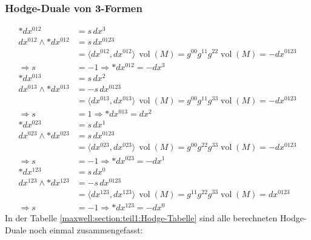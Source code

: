 \subsubsection{Hodge-Duale von 3-Formen}
\begin{align*}
	\ast dx^{012} &= s \, dx^3 \\
	dx^{012} \wedge \ast dx^{012} &= s \, dx^{0123} \\
	&= \langle dx^{012}, dx^{012} \rangle \, \operatorname{vol}(M) 
	= g^{00} g^{11} g^{22} \operatorname{vol}(M) = -dx^{0123} \\
	\Rightarrow s &= -1 \Rightarrow \boxed{\ast dx^{012} = - dx^3}
	\\[1em]
	\ast dx^{013} &= s \, dx^2 \\
	dx^{013} \wedge \ast dx^{013} &= -s \, dx^{0123} \\
	&= \langle dx^{013}, dx^{013} \rangle \, \operatorname{vol}(M) 
	= g^{00} g^{11} g^{33} \operatorname{vol}(M) = -dx^{0123} \\
	\Rightarrow s &= 1 \Rightarrow \boxed{\ast dx^{013} = dx^2}
	\\[1em]
	\ast dx^{023} &= s \, dx^1 \\
	dx^{023} \wedge \ast dx^{023} &= s \, dx^{0123} \\
	&= \langle dx^{023}, dx^{023} \rangle \, \operatorname{vol}(M) 
	= g^{00} g^{22} g^{33} \operatorname{vol}(M) = -dx^{0123} \\
	\Rightarrow s &= -1 \Rightarrow \boxed{\ast dx^{023} = - dx^1}
	\\[1em]
	\ast dx^{123} &= s \, dx^0 \\
	dx^{123} \wedge \ast dx^{123} &= -s \, dx^{0123} \\
	&= \langle dx^{123}, dx^{123} \rangle \, \operatorname{vol}(M)
	= g^{11} g^{22} g^{33} \operatorname{vol}(M) = dx^{0123} \\
	\Rightarrow s &= -1 \Rightarrow \boxed{\ast dx^{123} = - dx^0}
\end{align*}
In der Tabelle \ref{maxwell:section:teil1:Hodge-Tabelle} sind alle berechneten Hodge-Duale noch einmal zusammengefasst:
